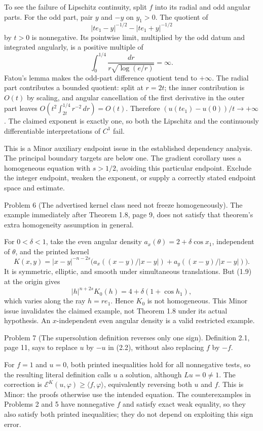 \documentclass[10pt]{article}
\begin{document}
To see the failure of Lipschitz continuity, split \(f\) into its radial and odd angular parts. For the odd part, pair \(y\) and \(-y\) on \(y_1>0\). The quotient of \[|te_1-y|^{-1/2}-|te_1+y|^{-1/2}\] by \(t>0\) is nonnegative. Its pointwise limit, multiplied by the odd datum and integrated angularly, is a positive multiple of \[\int_0^{1/4}\frac{dr}{r\sqrt{\log(e/r)}}=\infty .\] Fatou’s lemma makes the odd-part difference quotient tend to \(+\infty\). The radial part contributes a bounded quotient: split at \(r=2t\); the inner contribution is \(O(t)\) by scaling, and angular cancellation of the first derivative in the outer part leaves \(O(t^2\int_{2t}^{1/4}r^{-2}\,dr)=O(t)\). Therefore \((u(te_1)-u(0))/t\to+\infty\). The claimed exponent is exactly one, so both the Lipschitz and the continuously differentiable interpretations of \(C^1\) fail.\par
This is a Minor auxiliary endpoint issue in the established dependency analysis. The principal boundary targets are below one. The gradient corollary uses a homogeneous equation with \(s>1/2\), avoiding this particular endpoint. Exclude the integer endpoint, weaken the exponent, or supply a correctly stated endpoint space and estimate.\par
Problem 6 (The advertised kernel class need not freeze homogeneously).  The example immediately after Theorem 1.8, page 9, does not satisfy that theorem’s extra homogeneity assumption in general.\par
For \(0<\delta<1\), take the even angular density \(a_x(\theta)=2+\delta\cos x_1\), independent of \(\theta\), and the printed kernel \[K(x,y)=|x-y|^{-n-2s}
          \bigl(a_x((x-y)/|x-y|)+a_y((x-y)/|x-y|)\bigr).\] It is symmetric, elliptic, and smooth under simultaneous translations. But (1.9) at the origin gives \[|h|^{n+2s}K_0(h)=4+\delta(1+\cos h_1),\] which varies along the ray \(h=re_1\). Hence \(K_0\) is not homogeneous. This Minor issue invalidates the claimed example, not Theorem 1.8 under its actual hypothesis. An \(x\)-independent even angular density is a valid restricted example.\par
Problem 7 (The supersolution definition reverses only one sign).  Definition 2.1, page 11, says to replace \(u\) by \(-u\) in (2.2), without also replacing \(f\) by \(-f\).\par
For \(f=1\) and \(u=0\), both printed inequalities hold for all nonnegative tests, so the resulting literal definition calls \(u\) a solution, although \(Lu=0\ne1\). The correction is \(\mathcal E^K(u,\varphi)\ge\langle f,\varphi\rangle\), equivalently reversing both \(u\) and \(f\). This is Minor: the proofs otherwise use the intended equation. The counterexamples in Problems 2 and 5 have nonnegative \(f\) and satisfy exact weak equality, so they also satisfy both printed inequalities; they do not depend on exploiting this sign error.\par
\end{document}
